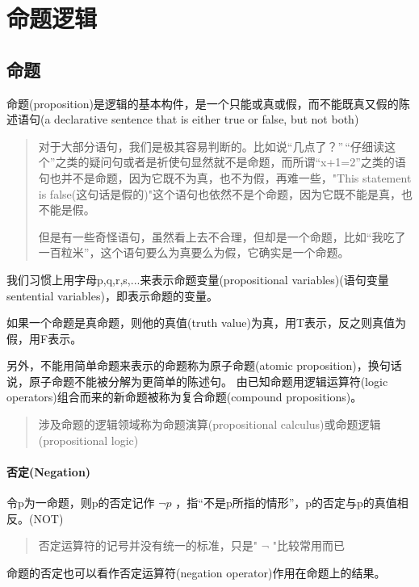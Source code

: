 \documentclass[12pt,a4paper,oneside]{ctexart}
\author{潘宇琦}
\begin{document}
\section*{命题逻辑}

\subsection*{命题}

命题(proposition)是逻辑的基本构件，是一个只能或真或假，而不能既真又假的陈述语句(a declarative sentence that is either true or false, but not both)

\begin{quote}
对于大部分语句，我们是极其容易判断的。比如说``几点了？''\,``仔细读这个''之类的疑问句或者是祈使句显然就不是命题，而所谓``x+1=2''之类的语句也并不是命题，因为它既不为真，也不为假，再难一些，"This statement is false(这句话是假的)"这个语句也依然不是个命题，因为它既不能是真，也不能是假。

但是有一些奇怪语句，虽然看上去不合理，但却是一个命题，比如``我吃了一百粒米''，这个语句要么为真要么为假，它确实是一个命题。
\end{quote}

我们习惯上用字母p,q,r,s,...来表示命题变量(propositional variables)(语句变量sentential variables)，即表示命题的变量。

如果一个命题是真命题，则他的真值(truth value)为真，用T表示，反之则真值为假，用F表示。

另外，不能用简单命题来表示的命题称为原子命题(atomic proposition)，换句话说，原子命题不能被分解为更简单的陈述句。 由已知命题用逻辑运算符(logic operators)组合而来的新命题被称为复合命题(compound propositions)。

\begin{quote}
涉及命题的逻辑领域称为命题演算(propositional calculus)或命题逻辑(propositional logic)
\end{quote}

\paragraph*{否定(Negation)}

令p为一命题，则p的否定记作 \(\neg p\) ，指``不是p所指的情形''，p的否定与p的真值相反。(NOT)

\begin{quote}
否定运算符的记号并没有统一的标准，只是" \(\neg\) "比较常用而已
\end{quote}

命题的否定也可以看作否定运算符(negation operator)作用在命题上的结果。
\end{document}

